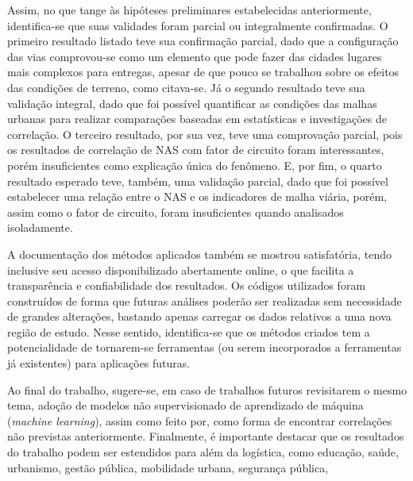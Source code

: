 Assim, no que tange às hipóteses preliminares estabelecidas anteriormente, identifica-se que suas validades foram parcial ou integralmente confirmadas.
O primeiro resultado listado teve sua confirmação parcial, dado que a configuração das vias comprovou-se como um elemento que pode fazer das cidades lugares mais complexos para entregas, apesar de que pouco se trabalhou sobre os efeitos das condições de terreno, como citava-se.
Já o segundo resultado teve sua validação integral, dado que foi possível quantificar as condições das malhas urbanas para realizar comparações baseadas em estatísticas e  investigações de correlação. 
O terceiro resultado, por sua vez, teve uma comprovação parcial, pois os resultados de correlação de NAS com fator de circuito foram interessantes, porém insuficientes como explicação única do fenômeno.
E, por fim, o quarto resultado esperado teve, também, uma validação parcial, dado que foi possível estabelecer uma relação entre o NAS e os indicadores de malha viária, porém, assim como o fator de circuito, foram insuficientes quando analisados isoladamente.

A documentação dos métodos aplicados também se mostrou satisfatória, tendo inclusive seu acesso disponibilizado abertamente online, o que facilita a transparência e confiabilidade dos resultados.
Os códigos utilizados foram construídos de forma que futuras análises poderão ser realizadas sem necessidade de grandes alterações, bastando apenas carregar os dados relativos a uma nova região de estudo.
Nesse sentido, identifica-se que os métodos criados tem a potencialidade de tornarem-se ferramentas (ou serem incorporados a ferramentas já existentes) para aplicações futuras.

Ao final do trabalho, sugere-se, em caso de trabalhos futuros revisitarem o mesmo tema, adoção de modelos não supervisionado de aprendizado de máquina (\textit{machine learning}), assim como feito por, como forma de encontrar correlações não previstas anteriormente.
Finalmente, é importante destacar que os resultados do trabalho podem ser estendidos para além da logística, como educação, saúde, urbanismo, gestão pública, mobilidade urbana, segurança pública, 
